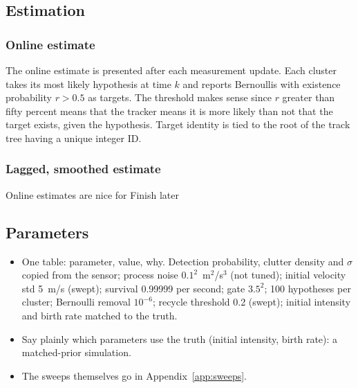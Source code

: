 \subsection{Estimation}
\label{sec:impl-estimation}

\subsubsection{Online estimate}
The online estimate is presented after each measurement update. Each cluster takes its most likely hypothesis at time $k$ and reports Bernoullis with existence probability $r > 0.5$ as targets. The threshold makes sense since $r$ greater than fifty percent means that the tracker means it is more likely than not that the target exists, given the hypothesis. Target identity is tied to the root of the track tree having a unique integer ID.

\subsubsection{Lagged, smoothed estimate}
Online estimates are nice for 
Finish later

\subsection{Parameters}
\label{sec:impl-parameters}
\begin{itemize}
    \item One table: parameter, value, why. Detection probability, clutter density and $\sigma$ copied from the sensor; process noise $0.1^2$~m$^2$/s$^3$ (not tuned); initial velocity std 5~m/s (swept); survival 0.99999 per second; gate $3.5^2$; 100 hypotheses per cluster; Bernoulli removal $10^{-6}$; recycle threshold 0.2 (swept); initial intensity and birth rate matched to the truth.
    \item Say plainly which parameters use the truth (initial intensity, birth rate): a matched-prior simulation.
    \item The sweeps themselves go in Appendix~\ref{app:sweeps}.
\end{itemize}
